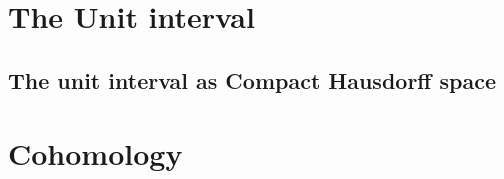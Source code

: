 \documentclass{../util/zariski}
\begin{document}
\section{The Unit interval}
\subsection{The unit interval as Compact Hausdorff space}


 
\section{Cohomology}

%

\printbibliography
\end{document}
